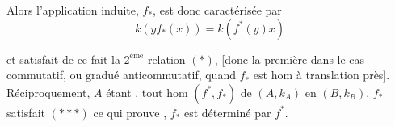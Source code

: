 Alors l'application induite,  $f_*$, est donc caractérisée par
\[
k(y f_*(x))=k(f^*(y)x) \tag*{$(\ast\ast\ast)$}
\]

et satisfait de ce fait la $2^{\text{ème}}$ relation $(\ast)$, [donc la première dans le cas commutatif, ou gradué anticommutatif, quand $f_*$ est hom à translation  près].
Réciproquement, $A$ étant ,  tout hom $(f^*,f_*)$ de $(A,k_A)$ en $(B,k_B)$, $f_*$ satisfait $(\ast\ast\ast)$ ce qui prouve , $f_*$ est déterminé par $f^*$.

